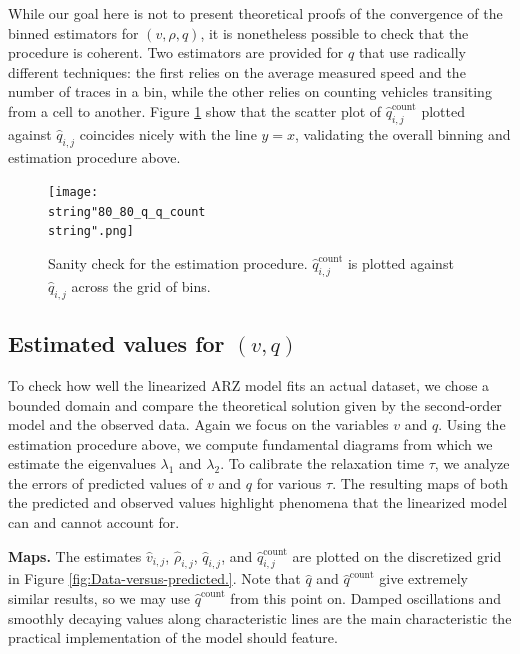 \documentclass[5p,twocolumn]{elsarticle}
\DeclareMathOperator{\cnt}{count}
\begin{document}
While our goal here is not to present theoretical proofs of the convergence of the binned estimators for $\left(v,\rho,q\right)$, it is nonetheless possible to check that the procedure is coherent. Two estimators are provided for $q$ that use radically
different techniques: the first relies on the average measured speed and the number of traces in a bin, while the other relies on counting vehicles transiting from a cell to another. Figure \ref{fig:Sanity-check} show that the scatter plot of $\widehat{q}_{i,j}^{\cnt}$ plotted against $\widehat{q}_{i,j}$ coincides nicely with the line $y=x$, validating the overall binning and estimation procedure above.

\begin{figure}
\centering
\texttt{[image: \\string"80\_80\_q\_q\_count\\string".png]}
\protect\caption{Sanity check for the estimation procedure. $\widehat{q}_{i,j}^{\text{count}}$
is plotted against $\widehat{q}_{i,j}$ across the grid of bins.
\label{fig:Sanity-check}}
\end{figure}



\subsection{Estimated values for $\left(v,q\right)$} 

To check how well the linearized ARZ model fits an actual dataset, we chose a bounded domain and compare the theoretical solution given by the second-order model and the observed data. Again we focus on the variables $v$ and $q$. Using the estimation procedure above, we compute fundamental diagrams from which we estimate the eigenvalues $\lambda_{1}$ and $\lambda_{2}$.
To calibrate the relaxation time $\tau$, we analyze the errors of predicted values of $v$ and $q$ for various $\tau$. The resulting maps of both the predicted and observed values highlight phenomena that the linearized model can and cannot account for. 

\textbf{Maps.} The estimates $\widehat{v}_{i,j}$, $\widehat{\rho}_{i,j}$, $\widehat{q}_{i,j}$, and $\widehat{q}_{i,j}^{\text{count}}$ are plotted on the discretized grid in Figure \ref{fig:Data-versus-predicted.}. Note that $\widehat{q}$ and $\widehat{q}^{\text{count}}$ give extremely similar results, so we may use $\widehat{q}^{\text{count}}$ from this point on. Damped oscillations and smoothly decaying values along characteristic lines are the main characteristic the practical implementation of the model should feature.
\end{document}
